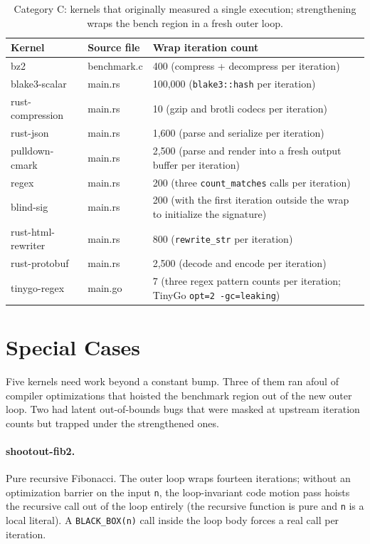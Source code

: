 \begin{table}[h]
\centering
\small
\begin{tabular}{l l p{6.5cm}}
\toprule
Kernel & Source file & Wrap iteration count \\
\midrule
bz2                & benchmark.c & 400 (compress + decompress per iteration) \\
blake3-scalar      & main.rs     & 100{,}000 (\texttt{blake3::hash} per iteration) \\
rust-compression   & main.rs     & 10 (gzip and brotli codecs per iteration) \\
rust-json          & main.rs     & 1{,}600 (parse and serialize per iteration) \\
pulldown-cmark     & main.rs     & 2{,}500 (parse and render into a fresh output buffer per iteration) \\
regex              & main.rs     & 200 (three \texttt{count\_matches} calls per iteration) \\
blind-sig          & main.rs     & 200 (with the first iteration outside the wrap to initialize the signature) \\
rust-html-rewriter & main.rs     & 800 (\texttt{rewrite\_str} per iteration) \\
rust-protobuf      & main.rs     & 2{,}500 (decode and encode per iteration) \\
tinygo-regex       & main.go     & 7 (three regex pattern counts per iteration; TinyGo \texttt{opt=2 -gc=leaking}) \\
\bottomrule
\end{tabular}
\caption{Category C: kernels that originally measured a single execution; strengthening wraps the bench region in a fresh outer loop.}
\end{table}

\section{Special Cases}
\label{sec:appA:special}

Five kernels need work beyond a constant bump. Three of them ran afoul of compiler optimizations that hoisted the benchmark region out of the new outer loop. Two had latent out-of-bounds bugs that were masked at upstream iteration counts but trapped under the strengthened ones.

\paragraph{shootout-fib2.} Pure recursive Fibonacci. The outer loop wraps fourteen iterations; without an optimization barrier on the input \texttt{n}, the loop-invariant code motion pass hoists the recursive call out of the loop entirely (the recursive function is pure and \texttt{n} is a local literal). A \texttt{BLACK\_BOX(n)} call inside the loop body forces a real call per iteration.

